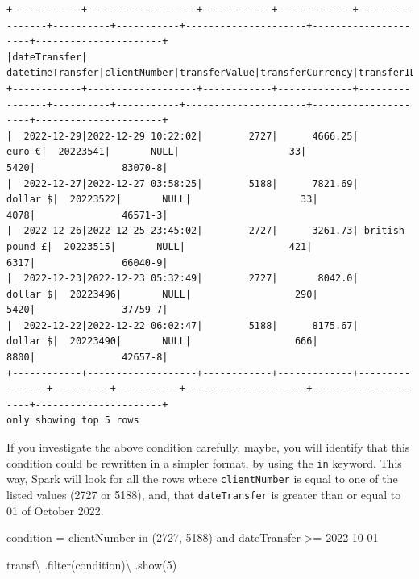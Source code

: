 \documentclass[
  11pt,
  letterpaper,
  DIV=11,
  numbers=noendperiod]{scrreprt}
\newenvironment{Shaded}{\begin{snugshade}}{\end{snugshade}}
\newcommand{\BuiltInTok}[1]{\textcolor[rgb]{0.00,0.23,0.31}{#1}}
\newcommand{\DecValTok}[1]{\textcolor[rgb]{0.68,0.00,0.00}{#1}}
\newcommand{\NormalTok}[1]{\textcolor[rgb]{0.00,0.23,0.31}{#1}}
\newcommand{\OperatorTok}[1]{\textcolor[rgb]{0.37,0.37,0.37}{#1}}
\newcommand{\StringTok}[1]{\textcolor[rgb]{0.13,0.47,0.30}{#1}}
\begin{document}
\begin{verbatim}
+------------+-------------------+------------+-------------+----------------+----------+-----------+---------------------+---------------------+----------------------+
|dateTransfer|   datetimeTransfer|clientNumber|transferValue|transferCurrency|transferID|transferLog|destinationBankNumber|destinationBankBranch|destinationBankAccount|
+------------+-------------------+------------+-------------+----------------+----------+-----------+---------------------+---------------------+----------------------+
|  2022-12-29|2022-12-29 10:22:02|        2727|      4666.25|          euro €|  20223541|       NULL|                   33|                 5420|               83070-8|
|  2022-12-27|2022-12-27 03:58:25|        5188|      7821.69|        dollar $|  20223522|       NULL|                   33|                 4078|               46571-3|
|  2022-12-26|2022-12-25 23:45:02|        2727|      3261.73| british pound £|  20223515|       NULL|                  421|                 6317|               66040-9|
|  2022-12-23|2022-12-23 05:32:49|        2727|       8042.0|        dollar $|  20223496|       NULL|                  290|                 5420|               37759-7|
|  2022-12-22|2022-12-22 06:02:47|        5188|      8175.67|        dollar $|  20223490|       NULL|                  666|                 8800|               42657-8|
+------------+-------------------+------------+-------------+----------------+----------+-----------+---------------------+---------------------+----------------------+
only showing top 5 rows
\end{verbatim}

If you investigate the above condition carefully, maybe, you will
identify that this condition could be rewritten in a simpler format, by
using the \texttt{in} keyword. This way, Spark will look for all the
rows where \texttt{clientNumber} is equal to one of the listed values
(2727 or 5188), and, that \texttt{dateTransfer} is greater than or equal
to 01 of October 2022.

\begin{Shaded}
\begin{Highlighting}[]
\NormalTok{condition }\OperatorTok{=} \StringTok{\textquotesingle{}\textquotesingle{}\textquotesingle{}}
\StringTok{  clientNumber in (2727, 5188)}
\StringTok{  and dateTransfer \textgreater{}= \textquotesingle{}2022{-}10{-}01\textquotesingle{}}
\StringTok{\textquotesingle{}\textquotesingle{}\textquotesingle{}}

\NormalTok{transf}\OperatorTok{\textbackslash{}}
\NormalTok{  .}\BuiltInTok{filter}\NormalTok{(condition)}\OperatorTok{\textbackslash{}}
\NormalTok{  .show(}\DecValTok{5}\NormalTok{)}
\end{Highlighting}
\end{Shaded}
\end{document}
